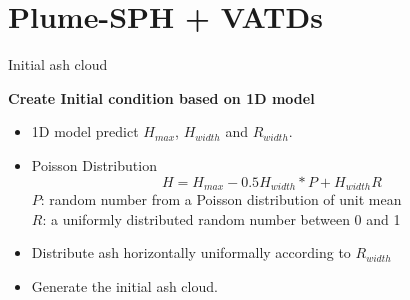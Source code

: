 \documentclass{beamer}
\begin{document}
\section{Plume-SPH + VATDs}
\begin{frame}{Initial ash cloud}
\begin{minipage}{.67\textwidth}
\textbf{Create Initial condition based on 1D model}
\begin{itemize}
\item 1D model predict $H_{max}$, $H_{width}$ and $R_{width}$.
\item Poisson Distribution
\begin{equation}
H=H_{max} - 0.5 H_{width}*P+H_{width}R
\label{eq:Poisson-plume-shape}
\end{equation}
$P$: random number from a Poisson
distribution of unit mean \\ 
$R$: a uniformly distributed random number between 0 and 1
\item Distribute ash horizontally uniformally according to $R_{width}$
\item Generate the initial ash cloud.
\end{itemize}
\end{minipage}
\noindent
\begin{minipage}{.32\textwidth}

\end{minipage}
\end{frame}
\end{document}
